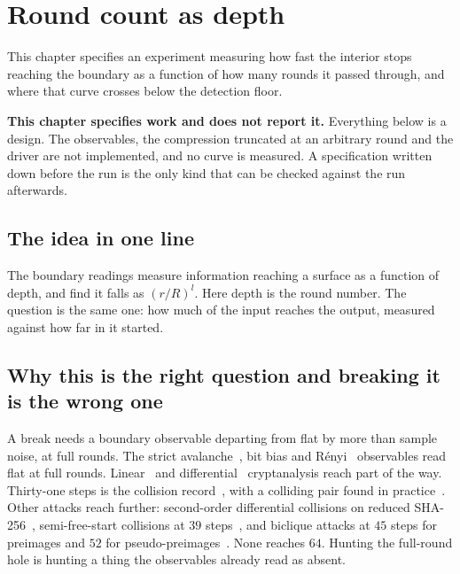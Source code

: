 \chapter{Round count as depth}

This chapter specifies an experiment measuring how fast the interior stops reaching the boundary as a function of how many rounds it passed through, and where that curve crosses below the detection floor.

\textbf{This chapter specifies work and does not report it.} Everything below is a design. The observables, the compression truncated at an arbitrary round and the driver are not implemented, and no curve is measured. A specification written down before the run is the only kind that can be checked against the run afterwards.

\section{The idea in one line}

The boundary readings measure information reaching a surface as a function of depth, and find it falls as \((r/R)^l\). Here depth is the round number. The question is the same one: how much of the input reaches the output, measured against how far in it started.

\section{Why this is the right question and breaking it is the wrong one}

A break needs a boundary observable departing from flat by more than sample noise, at full rounds. The strict avalanche~\cite{src:Webster-and-Tavares-1986}, bit bias and Rényi~\cite{src:Renyi} observables read flat at full rounds. Linear~\cite{src:Matsui-1994} and differential~\cite{src:Biham-and-Shamir-1991} cryptanalysis reach part of the way. Thirty-one steps is the collision record~\cite{src:Mendel-Nad-and-Schlaffer-2015}, with a colliding pair found in practice~\cite{src:Li-Liu-Wang-Dong-and-Sun-2024}. Other attacks reach further: second-order differential collisions on reduced SHA-256~\cite{src:Biryukov-Lamberger-Mendel-and-Nikolic-2011}, semi-free-start collisions at \(39\) steps~\cite{src:Li-Liu-and-Wang-2024}, and biclique attacks at \(45\) steps for preimages and \(52\) for pseudo-preimages~\cite{src:Khovratovich-Rechberger-and-Savelieva-2012}. None reaches \(64\). Hunting the full-round hole is hunting a thing the observables already read as absent.

